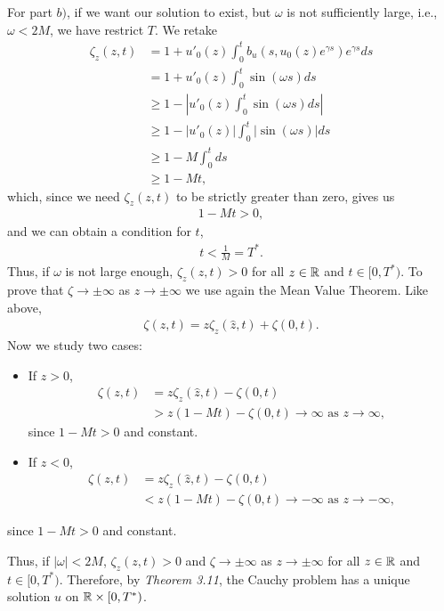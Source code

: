 \begin{questions}
\begin{solution}
For part $b)$, if we want our solution to exist, but $\omega$ is not sufficiently large, i.e., $\omega<2M$, we have restrict $T$. We retake
\begin{align*}
\zeta_z(z,t)&=1+u'_0(z)\int_0^tb_u\left(s,u_0(z)e^{\gamma s}\right)e^{\gamma s}ds\\
&=1+u'_0(z)\int_0^t\sin{(\omega s)}ds\\
&\geq 1-\left|u'_0(z)\int_0^t\sin{(\omega s)}ds\right|\\
&\geq 1-\left|u'_0(z)\right|\int_0^t\left|\sin{(\omega s)}\right|ds\\
&\geq 1-M\int_0^tds\\
&\geq 1-Mt,
\end{align*}
which, since we need $\zeta_z(z,t)$ to be strictly greater than zero, gives us
\begin{align*}
1-Mt>0,
\end{align*}
and we can obtain a condition for $t$,
\begin{align*}
t<\frac{1}{M}=T^*.
\end{align*}
Thus, if $\omega$ is not large enough, $\zeta_z(z,t)>0$ for all $z\in\mathbb{R}$ and $t\in[0,T^*)$. To prove that $\zeta\rightarrow\pm\infty$ as $z\rightarrow\pm\infty$ we use again the Mean Value Theorem. Like above,
\begin{align*}
\zeta(z,t)=z\zeta_z(\hat{z},t)+\zeta(0,t).
\end{align*}
Now we study two cases:
\begin{itemize}
\item If $z>0$,
\begin{align*}
\zeta(z,t)&=z\zeta_z(\hat{z},t)-\zeta(0,t)\\
&>z(1-Mt)-\zeta(0,t)\rightarrow\infty\text{ as } z\rightarrow\infty,
\end{align*}
since $1-Mt>0$ and constant.
\item If $z<0$,
\begin{align*}
\zeta(z,t)&=z\zeta_z(\hat{z},t)-\zeta(0,t)\\
&<z(1-Mt)-\zeta(0,t)\rightarrow -\infty\text{ as } z\rightarrow -\infty,
\end{align*}
\end{itemize}
since $1-Mt>0$ and constant. 

Thus, if $|\omega|<2M$, $\zeta_z(z,t)>0$ and $\zeta\rightarrow\pm\infty$ as $z\rightarrow\pm\infty$ for all $z\in\mathbb{R}$ and $t\in[0,T^*)$. Therefore, by \textsl{Theorem 3.11}, the Cauchy problem has a unique solution $u$ on $\mathbb{R}\times[0,T^*)$.
\end{solution}
\end{questions}